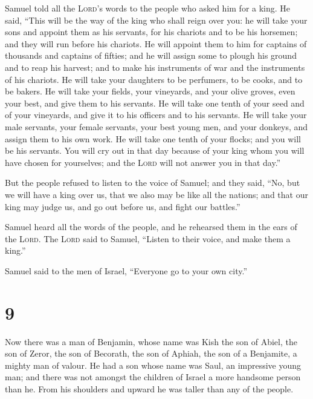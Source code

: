  Samuel told all the \textsc{Lord}'s words to the people
who asked him for a king.  He said, ``This will be the
way of the king who shall reign over you: he will take your sons and
appoint them as his servants, for his chariots and to be his horsemen;
and they will run before his chariots.  He will appoint
them to him for captains of thousands and captains of fifties; and he
will assign some to plough his ground and to reap his harvest; and to
make his instruments of war and the instruments of his chariots.
 He will take your daughters to be perfumers, to be
cooks, and to be bakers.  He will take your fields, your
vineyards, and your olive groves, even your best, and give them to his
servants.  He will take one tenth of your seed and of
your vineyards, and give it to his officers and to his servants.
 He will take your male servants, your female servants,
your best young men, and your donkeys, and assign them to his own work.
 He will take one tenth of your flocks; and you will be
his servants.  You will cry out in that day because of
your king whom you will have chosen for yourselves; and the
\textsc{Lord} will not answer you in that day.''

 But the people refused to listen to the voice of Samuel;
and they said, ``No, but we will have a king over us, 
that we also may be like all the nations; and that our king may judge
us, and go out before us, and fight our battles.''

 Samuel heard all the words of the people, and he
rehearsed them in the ears of the \textsc{Lord}.  The
\textsc{Lord} said to Samuel, ``Listen to their voice, and make them a
king.''

Samuel said to the men of Israel, ``Everyone go to your own city.''

\hypertarget{section-8}{%
\section{9}\label{section-8}}

 Now there was a man of Benjamin, whose name was Kish the
son of Abiel, the son of Zeror, the son of Becorath, the son of Aphiah,
the son of a Benjamite, a mighty man of valour.  He had a
son whose name was Saul, an impressive young man; and there was not
amongst the children of Israel a more handsome person than he. From his
shoulders and upward he was taller than any of the people.

